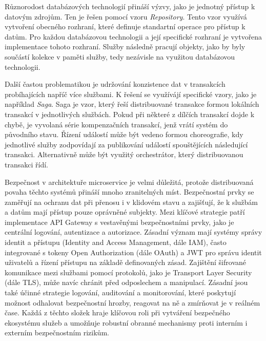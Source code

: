 Různorodost databázových technologií přináší výzvy, jako je jednotný přístup k datovým zdrojům. Ten je řešen pomocí vzoru \emph{Repository}. Tento vzor využívá vytvoření obecného rozhraní, které definuje standartní operace pro přístup k datům. Pro každou databázovou technologii a její specifické rozhraní je vytvořena implementace tohoto rozhraní. \cite{Newman2015} Služby následně pracují objekty, jako by byly součástí kolekce v paměti služby, tedy nezávisle na využitou databázovou technologii.


Další častou problematikou je udržování konzistence dat v transakcích probíhajících napříč více službami. K řešení se využívájí specifické vzory, jako je například \emph{Saga}. Saga je vzor, který řeší distribuované transakce formou lokálních transakcí v jednotlivých službách. Pokud při některé z dílčích transakcí dojde k chybě, je vyvolaná série kompenzačních transakcí, jenž vrátí systém do původního stavu. Řízení událostí může být vedeno formou choreografie, kdy jednotlivé služby zodpovídají za publikování událostí spouštějících následující transakci. Alternativně může být využitý orchestrátor, který distribuovanou transakci řídí. \cite{richardsonsaga}


Bezpečnost v architektuře microservice je velmi důležitá, protože distribuovaná povaha těchto systémů přináší mnoho zranitelných míst. Bezpečnostní prvky se zaměřují na ochranu dat při přenosu i v klidovém stavu a zajišťují, že k službám a datům mají přístup pouze oprávněné subjekty. Mezi klíčové strategie patří implementace API Gateway s vestavěnými bezpečnostními prvky, jako je centrální logování, autentizace a autorizace. \cite{Williams2023} Zásadní význam mají systémy správy identit a přístupu (Identity and Access Management, dále IAM), často integrované s tokeny Open Authorization (dále OAuth) a JWT pro správu identit uživatelů a řízení přístupu na základě definovaných zásad. Zajištění šifrované komunikace mezi službami pomocí protokolů, jako je Transport Layer Security (dále TLS), může navíc chránit před odposlechem a manipulací. \cite{Richardson2018} Zásadní jsou také účinné strategie logování, auditování a monitorování, které poskytují možnost odhalovat bezpečnostní hrozby, reagovat na ně a zmírňovat je v reálném čase. Každá z těchto složek hraje klíčovou roli při vytváření bezpečného ekosystému služeb a umožňuje robustní obranné mechanismy proti interním i externím bezpečnostním rizikům.

